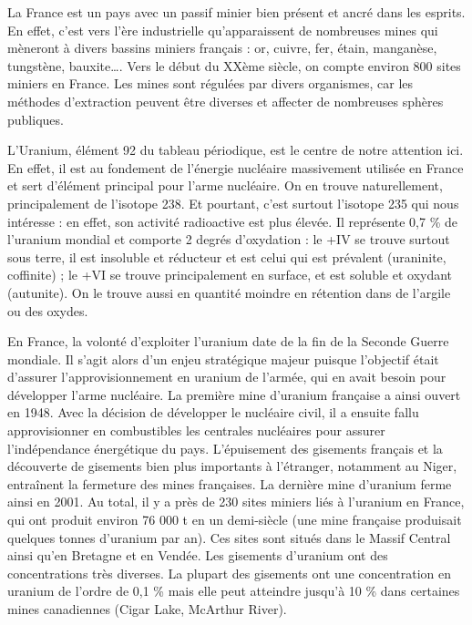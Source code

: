\documentclass{article}
\begin{document}
La France est un pays avec un passif minier bien présent et ancré dans les esprits. En effet, c’est vers l’ère industrielle qu’apparaissent de nombreuses mines qui mèneront à divers bassins miniers français : or, cuivre, fer, étain, manganèse, tungstène, bauxite…. Vers le début du XXème siècle, on compte environ 800 sites miniers en France. Les mines sont régulées par divers organismes, car les méthodes d’extraction peuvent être diverses et affecter de nombreuses sphères publiques.

L’Uranium, élément 92 du tableau périodique, est le centre de notre attention ici. En effet, il est au fondement de l’énergie nucléaire massivement utilisée en France et sert d’élément principal pour l’arme nucléaire. On en trouve naturellement, principalement de l’isotope 238. Et pourtant, c’est surtout l’isotope 235 qui nous intéresse : en effet, son activité radioactive est plus élevée. Il représente 0,7 \% de l’uranium mondial et comporte 2 degrés d’oxydation : le +IV se trouve surtout sous terre, il est insoluble et réducteur et est celui qui est prévalent (uraninite, coffinite) ; le +VI se trouve principalement en surface, et est soluble et oxydant (autunite). On le trouve aussi en quantité moindre en rétention dans de l’argile ou des oxydes.


En France, la volonté d’exploiter l’uranium date de la fin de la Seconde Guerre mondiale. Il s’agit alors d’un enjeu stratégique majeur puisque l’objectif était d’assurer l’approvisionnement en uranium de l’armée, qui en avait besoin pour développer l’arme nucléaire. La première mine d’uranium française a ainsi ouvert en 1948. Avec la décision de développer le nucléaire civil, il a ensuite fallu approvisionner en combustibles les centrales nucléaires pour assurer l’indépendance énergétique du pays. L’épuisement des gisements français et la découverte de gisements bien plus importants à l’étranger, notamment au Niger, entraînent la fermeture des mines françaises. La dernière mine d’uranium ferme ainsi en 2001. Au total, il y a près de 230 sites miniers liés à l’uranium en France, qui ont produit environ 76 000 t en un demi-siècle (une mine française produisait quelques tonnes d’uranium par an). Ces sites sont situés dans le Massif Central ainsi qu’en Bretagne et en Vendée.
Les gisements d’uranium ont des concentrations très diverses. La plupart des gisements ont une concentration en uranium de l’ordre de 0,1 \% mais elle peut atteindre jusqu’à 10 \% dans certaines mines canadiennes (Cigar Lake, McArthur River).
\end{document}
